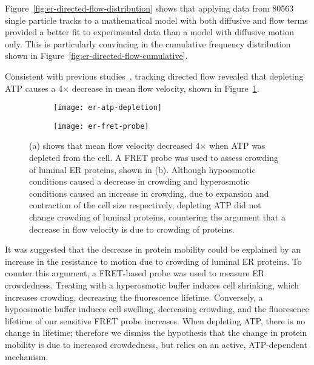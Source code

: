 Figure~\ref{fig:er-directed-flow-distribution} shows that applying data from \num{80563} single particle tracks to a mathematical model with both diffusive and flow terms provided a better fit to experimental data than a model with diffusive motion only. 
This is particularly convincing in the cumulative frequency distribution shown in Figure~\ref{fig:er-directed-flow-cumulative}. 

Consistent with previous studies~\cite{nehls2000dynamics}, tracking directed flow revealed that depleting ATP causes a 4$\times$ decrease in mean flow velocity, shown in Figure~\ref{fig:er-atp-depletion}. 

\begin{figure}[htbp!]
	\centering
	\begin{subfigure}[b]{0.3\textwidth}
		\texttt{[image: er-atp-depletion]}
		\caption{} \label{fig:er-atp-depletion}
	\end{subfigure}	
	\hspace{0.15\textwidth}
	\begin{subfigure}[b]{0.3\textwidth}
		\texttt{[image: er-fret-probe]}
		\caption{} \label{fig:er-fret-probe}
	\end{subfigure}	
	\caption[ER: Flow velocity is reduced upon ATP depletion; a FRET probe reveals this is not due to increased crowding]{(a) shows that mean flow velocity decreased 4$\times$ when ATP was depleted from the cell. A FRET probe was used to assess crowding of luminal ER proteins, shown in (b). Although hypoosmotic conditions caused a decrease in crowding and hyperosmotic conditions caused an increase in crowding, due to expansion and contraction of the cell size respectively, depleting ATP did not change crowding of luminal proteins, countering the argument that a decrease in flow velocity is due to crowding of proteins.} 
	\label{fig:er-atp}
\end{figure}

It was suggested that the decrease in protein mobility could be explained by an increase in the resistance to motion due to crowding of luminal ER proteins.
To counter this argument, a FRET-based probe was used to measure ER crowdedness.
Treating with a hyperosmotic buffer induces cell shrinking, which increases crowding, decreasing the fluorescence lifetime.
Conversely, a hypoosmotic buffer induces cell swelling, decreasing crowding, and the fluorescnce lifetime of our sensitive FRET probe increases.
When depleting ATP, there is no change in lifetime;
therefore we dismiss the hypothesis that the change in protein mobility is due to increased crowdedness, but relies on an active, ATP-dependent mechanism.


